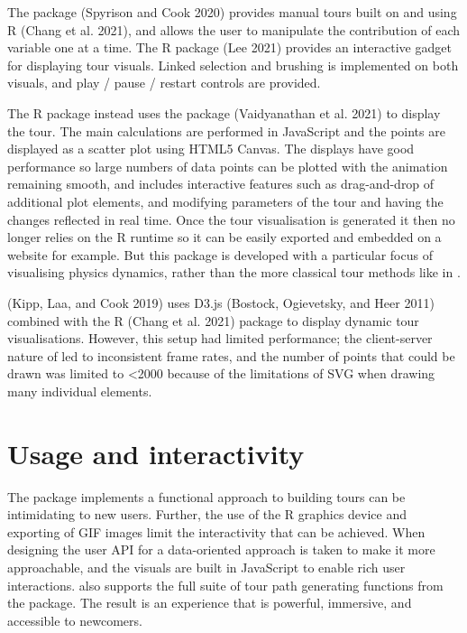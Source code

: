 The  package (Spyrison and Cook 2020) provides manual tours built on  and using R  (Chang et al. 2021), and allows the user to manipulate the contribution of each variable one at a time. The  R package (Lee 2021) provides an interactive gadget for displaying tour visuals. Linked selection and brushing is implemented on both visuals, and play / pause / restart controls are provided.

The  R package instead uses the  package (Vaidyanathan et al. 2021) to display the tour. The main calculations are performed in JavaScript and the points are displayed as a scatter plot using HTML5 Canvas. The displays have good performance so large numbers of data points can be plotted with the animation remaining smooth, and includes interactive features such as drag-and-drop of additional plot elements, and modifying parameters of the tour and having the changes reflected in real time. Once the tour visualisation is generated it then no longer relies on the R runtime so it can be easily exported and embedded on a website for example. But this package is developed with a particular focus of visualising physics dynamics, rather than the more classical tour methods like in .

(Kipp, Laa, and Cook 2019) uses D3.js (Bostock, Ogievetsky, and Heer 2011) combined with the R  (Chang et al. 2021) package to display dynamic tour visualisations. However, this setup had limited performance; the client-server nature of  led to inconsistent frame rates, and the number of points that could be drawn was limited to \textless2000 because of the limitations of SVG when drawing many individual elements.

\hypertarget{usage-and-interactivity}{%
\section{Usage and interactivity}\label{usage-and-interactivity}}

The  package implements a functional approach to building tours can be intimidating to new users. Further, the use of the R graphics device and exporting of GIF images limit the interactivity that can be achieved. When designing the user API for  a data-oriented approach is taken to make it more approachable, and the visuals are built in JavaScript to enable rich user interactions.  also supports the full suite of tour path generating functions from the  package. The result is an experience that is powerful, immersive, and accessible to newcomers.

